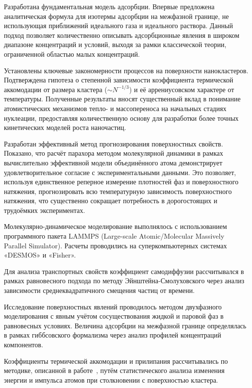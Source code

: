 {\influence} Разработана фундаментальная модель адсорбции. Впервые предложена аналитическая формула для изотермы адсорбции на межфазной границе, не использующая приближений идеального газа и идеального раствора. Данный подход позволяет количественно описывать адсорбционные явления в широком диапазоне концентраций и условий, выходя за рамки классической теории, ограниченной областью малых концентраций.

Установлены ключевые закономерности процессов на поверхности нанокластеров. Подтверждена гипотеза о степенной зависимости коэффициента термической аккомодации от размера кластера ($\sim N^{-1/3}$) и её аррениусовском характере от температуры. Полученные результаты вносят существенный вклад в понимание атомистических механизмов тепло- и массопереноса на начальных стадиях нуклеации, предоставляя количественную основу для разработки более точных кинетических моделей роста наночастиц.

Разработан эффективный метод прогнозирования поверхностных свойств. Показано, что расчёт парахора методом молекулярной динамики в рамках вычислительно эффективной модели объединённого атома демонстрирует удовлетворительное согласие с экспериментальными данными. Это позволяет, используя единственное реперное измерение плотностей фаз и поверхностного натяжения, прогнозировать всю температурную зависимость поверхностного натяжения, что существенно сокращает потребность в дорогостоящих и трудоёмких экспериментах.

{\methods} Молекулярно-динамическое моделирование выполнялось с использованием программного пакета LAMMPS (Large-scale Atomic/Molecular Massively Parallel Simulator). Расчеты проводились на суперкомпьютерных системах «DESMOS» и «Fisher».

Для анализа транспортных свойств коэффициент самодиффузии рассчитывался в рамках равновесного подхода по методу Эйнштейна-Смолуховского через анализ зависимости среднеквадратичного смещения частиц от времени.

Исследование поверхностных явлений проводилось методом двухфазного моделирования с явным учётом сосуществования жидкой и паровой фаз в равновесных условиях. Величина адсорбции на межфазной границе определялась в рамках гиббсовского формализма через анализ профилей концентраций компонентов.

Коэффициенты термической аккомодации и прилипания рассчитывались по методике, описанной в работе~\cite{insepov_kinetics_1991}, путём статистического анализа изменения энергии и импульса атомов при столкновении с поверхностью кластера.

